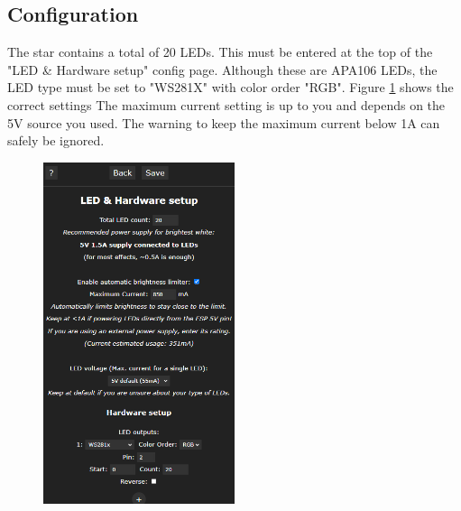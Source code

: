 \documentclass[12pt]{article}
\begin{document}
\subsection{Configuration}
The star contains a total of 20 LEDs. This must be entered at the top of the "LED \& Hardware setup" config page. Although these are APA106 LEDs, the LED type must be set to "WS281X" with color order "RGB".
Figure \ref{fig:wledConfig} shows the correct settings The maximum current setting is up to you and depends on the 5V source you used. The warning to keep the maximum current below 1A can safely be ignored.

\begin{figure}[H]
	\centering
	\includegraphics[width=0.5\textwidth]{../images/manual/wled_config.png}
	\caption{}
	\label{fig:wledConfig}
\end{figure}

\clearpage
\appendix

\end{document}
